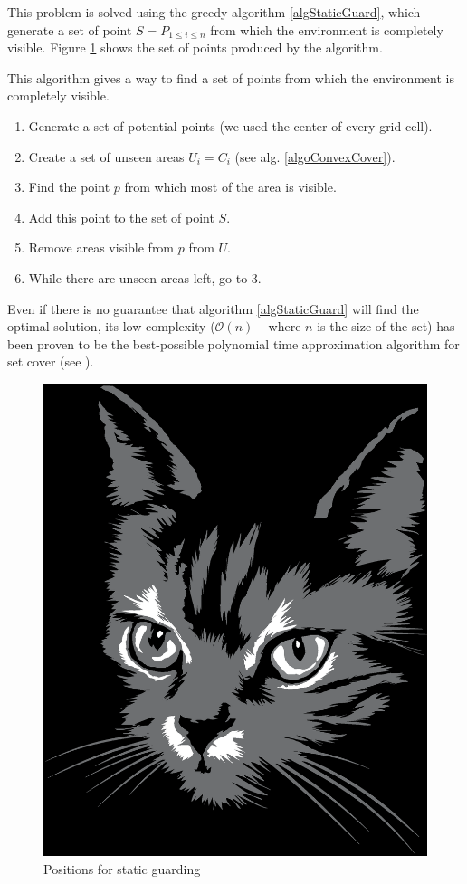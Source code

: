 This problem is solved using the greedy algorithm \ref{algStaticGuard}, which generate a set of point $ S = P_{1\leq i \leq n}$ from which the environment is completely visible. Figure \ref{staticCoverSet} shows the set of points produced by the algorithm.

\begin{algorithm}
This algorithm gives a way to find a set of points from which the environment is completely visible.
\begin{enumerate}
	\item Generate a set of potential points (we used the center of every grid cell).
	\item Create a set of unseen areas $U_i = C_i$ (see alg. \ref{algoConvexCover}).
	\item Find the point $p$ from which most of the area is visible.
	\item Add this point to the set of point $S$.
	\item Remove areas visible from $p$ from $U$.
	\item While there are unseen areas left, go to 3.
\end{enumerate}
\label{algStaticGuard}
\end{algorithm}

Even if there is no guarantee that algorithm \ref{algStaticGuard} will find the optimal solution, its low complexity ($\mathcal{O}(n)$ -- where $n$ is the size of the set) has been proven to be the best-possible polynomial time approximation algorithm for set cover (see \cite{approxMinProb}).

\begin{figure}[h!t]
	\centering
	\includegraphics[height=0.5\linewidth]{fig/cat.eps}
	\caption{Positions for static guarding}
	\label{staticCoverSet}
\end{figure}